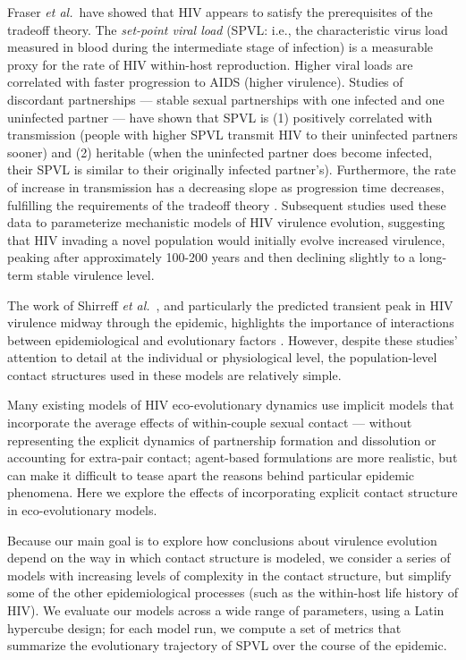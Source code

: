 \documentclass[10pt,letterpaper]{article}
\newcommand{\etal}{\textit{et al.}}
\begin{document}
Fraser \etal\ have showed that HIV appears to satisfy the prerequisites of
the tradeoff theory.
The \emph{set-point viral load} (SPVL: i.e., the
characteristic virus load measured in blood during the intermediate
stage of infection) is a measurable proxy for the rate of HIV within-host
reproduction.
Higher viral loads are
correlated with faster progression to AIDS (higher virulence).
Studies of discordant partnerships --- stable
sexual partnerships with one infected and one uninfected partner --- %
have shown that SPVL is (1) positively correlated with transmission
(people with higher SPVL transmit HIV to their uninfected partners 
sooner) and (2) heritable
(when the uninfected partner does become infected, 
their SPVL is similar to their originally infected partner's).
Furthermore, the rate of increase in transmission 
has a decreasing slope as progression time decreases,
fulfilling the requirements of the tradeoff theory
 \cite{Fraser+2007}.
Subsequent studies
\cite{shirreff_transmission_2011,herbeck_hiv_2014,herbeck_evolution_2016} used these data to
parameterize mechanistic models of HIV virulence evolution, suggesting
that HIV invading a novel population would initially evolve increased
virulence, peaking after approximately 100-200 years and then declining
slightly to a long-term stable virulence level.

The work of Shirreff \etal\ \cite{shirreff_transmission_2011}, and particularly the predicted transient peak in HIV virulence midway through the epidemic,
highlights the importance of interactions between epidemiological and
evolutionary factors \cite{day_virulence_2004,alizon_price_2009}.
However, despite these studies' attention to detail at the individual
or physiological level, the population-level contact structures used in these
models are relatively simple.

Many existing models of HIV eco-evolutionary dynamics use implicit
models that incorporate the average effects of within-couple sexual
contact --- without representing the explicit dynamics of partnership
formation and dissolution or accounting for extra-pair contact;
agent-based formulations are more realistic, but can make it difficult
to tease apart the reasons behind particular epidemic phenomena. 
Here we explore the effects of incorporating explicit contact structure in
eco-evolutionary models.

Because our main goal is to explore how conclusions about virulence
evolution depend on the way in which contact structure
is modeled, we consider a series of
models with increasing levels of complexity in the contact
structure, but simplify some of the other epidemiological
processes (such as the within-host life history of HIV). 
We evaluate our models
across a wide range of parameters, using a Latin hypercube design; for
each model run, we compute a set of metrics 
that summarize the evolutionary trajectory of SPVL
over the course of the epidemic.
\end{document}
